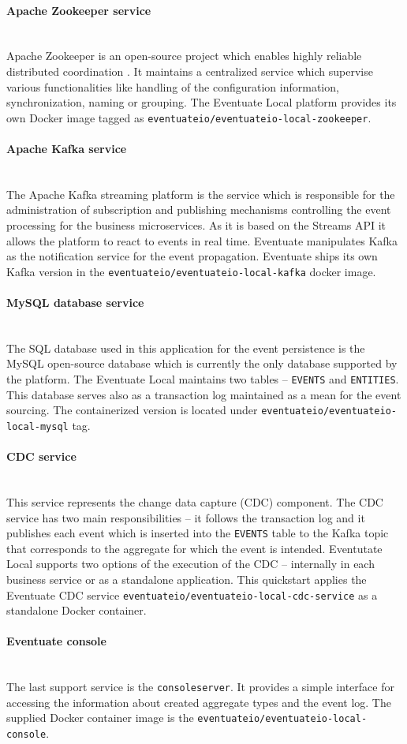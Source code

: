 \documentclass[oneside,
  digital, %
  table,   %
  nolof,     %
  nolot,     %
]{fithesis3}
\newcommand{\newlinepar}[1]{\paragraph{#1}\needspace{4\baselineskip}\mbox{}\\}
\begin{document}
\newlinepar{Apache Zookeeper service}

Apache Zookeeper is an open-source project which enables highly reliable distributed coordination \cite{apache_zookeeper}. It maintains a centralized service which supervise various functionalities like handling of the configuration information, synchronization, naming or grouping. The Eventuate Local platform provides its own Docker image tagged as \texttt{eventuateio/eventuateio-local-zookeeper}.

\newlinepar{Apache Kafka service}

The Apache Kafka streaming platform is the service which is responsible for the administration of subscription and publishing mechanisms controlling the event processing for the business microservices. As it is based on the Streams API it allows the platform to react to events in real time. Eventuate manipulates Kafka as the notification service for the event propagation. Eventuate ships its own Kafka version in the \texttt{eventuateio/eventuateio-local-kafka} docker image.

\newlinepar{MySQL database service}

The SQL database used in this application for the event persistence is the MySQL open-source database which is currently the only database supported by the platform. The Eventuate Local maintains two tables -- \texttt{EVENTS} and \texttt{ENTITIES}. This database serves also as a transaction log maintained as a mean for the event sourcing. The containerized version is located under \texttt{eventuateio/eventuateio-local-mysql} tag.

\newlinepar{CDC service}

This service represents the change data capture (CDC) component. The CDC service has two main responsibilities -- it follows the transaction log and it publishes each event which is inserted into the \texttt{EVENTS} table to the Kafka topic that corresponds to the aggregate for which the event is intended. Eventutate Local supports two options of the execution of the CDC -- internally in each business service or as a standalone application. This quickstart applies the Eventuate CDC service \texttt{eventuateio/eventuateio-local-cdc-service} as a standalone Docker container.

\newlinepar{Eventuate console}

The last support service is the \texttt{consoleserver}. It provides a simple interface for accessing the information about created aggregate types and the event log. The supplied Docker container image is the \texttt{eventuateio/eventuateio-local-console}.
\end{document}
